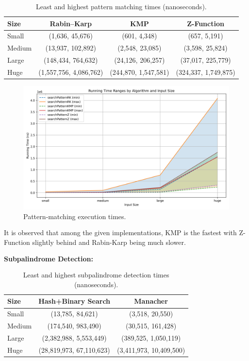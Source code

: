 \documentclass[12pt]{article}
\begin{document}
\begin{table}[H]
  \centering
  \begin{tabular}{@{}lccc@{}}
    \toprule
    Size   & Rabin–Karp            & KMP                  & Z-Function            \\ \midrule
    Small  & (1{,}636, 45{,}676)   & (601, 4{,}348)       & (657, 5{,}191)        \\
    Medium & (13{,}937, 102{,}892) & (2{,}548, 23{,}085)  & (3{,}598, 25{,}824)   \\
    Large  & (148{,}434, 764{,}632)& (24{,}126, 206{,}257)& (37{,}017, 225{,}779) \\
    Huge   & (1{,}557{,}756, 4{,}086{,}762) & (244{,}870, 1{,}547{,}581) & (324{,}337, 1{,}749{,}875) \\
    \bottomrule
  \end{tabular}
  \caption{Least and highest pattern matching times (nanoseconds).}
\end{table}

\begin{figure}[H]
  \centering
  \includegraphics[width=0.7\linewidth]{pattern-stats.png}
  \caption{Pattern‐matching execution times.}
\end{figure}

It is observed that among the given implementations, KMP is the fastest with Z-Function slightly behind and Rabin-Karp being much slower.

\medskip
\textbf{Subpalindrome Detection:}

\begin{table}[H]
  \centering
  \begin{tabular}{@{}lcc@{}}
    \toprule
    Size  & Hash+Binary Search     & Manacher               \\ \midrule
    Small & (13{,}785, 84{,}621)   & (3{,}518, 20{,}550)     \\
    Medium& (174{,}540, 983{,}490) & (30{,}515, 161{,}428)   \\
    Large & (2{,}382{,}988, 5{,}553{,}449) & (389{,}525, 1{,}050{,}119) \\
    Huge  & (28{,}819{,}973, 67{,}110{,}623) & (3{,}411{,}973, 10{,}409{,}500) \\
    \bottomrule
  \end{tabular}
  \caption{Least and highest subpalindrome detection times (nanoseconds).}
\end{table}
\end{document}
